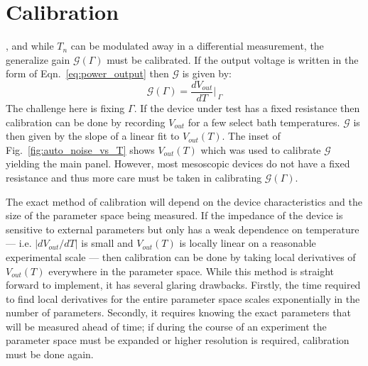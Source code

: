 \section{Calibration}
, and while $T_n$ can be modulated away in a differential measurement, the generalize gain $\mathcal{G}(\Gamma)$ must be calibrated. If the output voltage is written in the form of Eqn.~\ref{eq:power_output} then $\mathcal{G}$ is given by:
\begin{equation}
\mathcal{G}(\Gamma) = \frac{dV_{out}}{dT}\bigg\rvert_{~\Gamma}
\end{equation}
The challenge here is fixing $\Gamma$. If the device under test has a fixed resistance then calibration can be done by recording $V_{out}$ for a few select bath temperatures. $\mathcal{G}$ is then given by the slope of a linear fit to $V_{out}(T)$. The inset of Fig.~\ref{fig:auto_noise_vs_T} shows $V_{out}(T)$ which was used to calibrate $\mathcal{G}$ yielding the main panel. However, most mesoscopic devices do not have a fixed resistance and thus more care must be taken in calibrating $\mathcal{G}(\Gamma)$.

The exact method of calibration will depend on the device characteristics and the size of the parameter space being measured. If the impedance of the device is sensitive to external parameters but only has a weak dependence on temperature --- i.e. $|dV_{out}/dT|$ is small and $V_{out}(T)$ is locally linear on a reasonable experimental scale --- then calibration can be done by taking local derivatives of $V_{out}(T)$ everywhere in the parameter space. While this method is straight forward to implement, it has several glaring drawbacks. Firstly, the time required to find local derivatives for the entire parameter space scales exponentially in the number of parameters. Secondly, it requires knowing the exact parameters that will be measured ahead of time; if during the course of an experiment the parameter space must be expanded or higher resolution is required, calibration must be done again.

